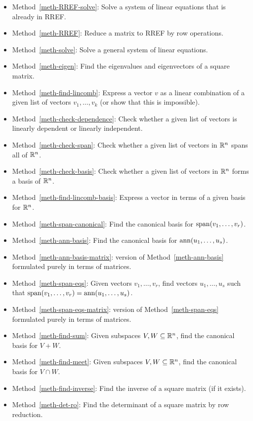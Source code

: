 \documentclass[reqno]{amsart}
\theoremstyle{definition}
\begin{document}
\begin{itemize}
 \item Method~\ref{meth-RREF-solve}:
  Solve a system of linear equations that is already in RREF.
 \item Method~\ref{meth-RREF}:
  Reduce a matrix to RREF by row operations.
 \item Method~\ref{meth-solve}:
  Solve a general system of linear equations.
 \item Method~\ref{meth-eigen}:
  Find the eigenvalues and eigenvectors of a square matrix.
 \item Method~\ref{meth-find-lincomb}:
  Express a vector $v$ as a linear combination of a given list of
  vectors $v_1,\dotsc,v_k$ (or show that this is impossible).
 \item Method~\ref{meth-check-dependence}:
  Check whether a given list of vectors is linearly dependent or
  linearly independent.
 \item Method~\ref{meth-check-span}:
  Check whether a given list of vectors in ${\mathbb{R}}^n$ spans all of ${\mathbb{R}}^n$.
 \item Method~\ref{meth-check-basis}:
  Check whether a given list of vectors in ${\mathbb{R}}^n$ forms a basis of ${\mathbb{R}}^n$.
 \item Method~\ref{meth-find-lincomb-basis}: Express a vector in terms
  of a given basis for ${\mathbb{R}}^n$.
 \item Method~\ref{meth-span-canonical}: Find the canonical basis for
  $\operatorname{span}(v_1,\dotsc,v_r)$.
 \item Method~\ref{meth-ann-basis}: Find the canonical basis for
  $\operatorname{ann}(u_1,\dotsc,u_s)$.
 \item Method~\ref{meth-ann-basis-matrix}: version of
  Method~\ref{meth-ann-basis} formulated purely in terms of matrices.
 \item Method~\ref{meth-span-eqs}: Given vectors $v_1,\dotsc,v_r$,
  find vectors $u_1,\dotsc,u_s$ such that
  $\operatorname{span}(v_1,\dotsc,v_r)=\operatorname{ann}(u_1,\dotsc,u_s)$.
 \item Method~\ref{meth-span-eqs-matrix}: version of
  Method~\ref{meth-span-eqs} formulated purely in terms of matrices.
 \item Method~\ref{meth-find-sum}: Given subspaces $V,W\subseteq{\mathbb{R}}^n$, find
  the canonical basis for $V+W$.
 \item Method~\ref{meth-find-meet}: Given subspaces $V,W\subseteq{\mathbb{R}}^n$, find
  the canonical basis for $V\cap W$.
 \item Method~\ref{meth-find-inverse}: Find the inverse of a square
  matrix (if it exists).
 \item Method~\ref{meth-det-ro}: Find the determinant of a square
  matrix by row reduction.
\end{itemize}
\end{document}
